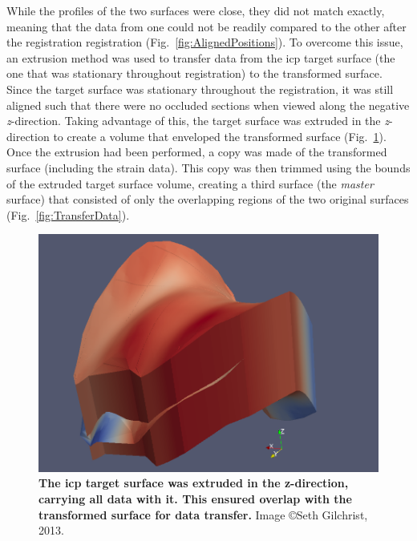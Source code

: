 While the profiles of the two surfaces were close, they did not match exactly, meaning that the data from one could not be readily compared to the other after the registration registration (Fig.~\ref{fig:AlignedPositions}).
To overcome this issue, an extrusion method was used to transfer data from the \ac{icp} target surface (the one that was stationary throughout registration) to the transformed surface.
Since the target surface was stationary throughout the registration, it was still aligned such that there were no occluded sections when viewed along the negative \textit{z}-direction.
Taking advantage of this, the target surface was extruded in the \textit{z}-direction to create a volume that enveloped the transformed surface (Fig.~\ref{fig:InstronExtruded}).
Once the extrusion had been performed, a copy was made of the transformed surface (including the strain data).
This copy was then trimmed using the bounds of the extruded target surface volume, creating a third surface (the \textit{master} surface) that consisted of only the overlapping regions of the two original surfaces (Fig.~\ref{fig:TransferData}).

\begin{figure}
\centering
\includegraphics[width=0.7\linewidth]{./fracture/Figures/InstronExtruded}
\caption[\acs*{icp} target surface extruded]{\textbf{The \ac{icp} target surface was extruded in the z-direction, carrying all data with it. This ensured overlap with the transformed surface for data transfer.} Image \copyright Seth Gilchrist, 2013.}
\label{fig:InstronExtruded}
\end{figure}


